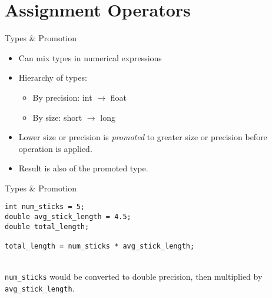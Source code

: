 \documentclass[graphics]{beamer}
\begin{document}
\section{Assignment Operators}\label{sec:assignop}
\begin{frame}{Types \& Promotion}
    \begin{itemize}
        \item Can mix types in numerical expressions
        \item Hierarchy of types:
        \begin{itemize}
            \item By precision: int $\rightarrow$ float
            \item By size: short $\rightarrow$ long
        \end{itemize}
        \item Lower size or precision is \textit{promoted} to greater size or precision before operation is applied.
        \item Result is also of the promoted type.
    \end{itemize}
\end{frame}

\begin{frame}[fragile]{Types \& Promotion}
\begin{verbatim}
int num_sticks = 5;
double avg_stick_length = 4.5;
double total_length;

total_length = num_sticks * avg_stick_length;
\end{verbatim} ~~ \\
\texttt{num\_sticks} would be converted to double precision, then multiplied by \texttt{avg\_stick\_length}.
\end{frame}
\end{document}
